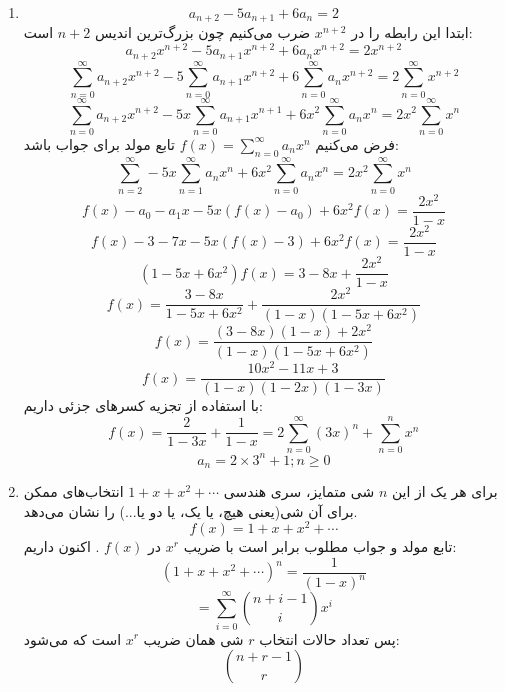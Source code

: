 \p
\begin{enumerate}
\item
$$a_{n+2} - 5a_{n+1} + 6a_n = 2$$
ابتدا این رابطه را در
$x^{n+2}$
ضرب می‌کنیم چون بزرگ‌ترین اندیس
$n+2$
است:
$$a_{n+2}x^{n+2} - 5a_{n+1}x^{n+2} + 6a_nx^{n+2} = 2x^{n+2}$$
$$\sum_{n=0}^{\infty}a_{n+2}x^{n+2} - 5\sum_{n=0}^{\infty}a_{n+1}x^{n+2} + 6\sum_{n=0}^{\infty}a_nx^{n+2} = 2\sum_{n=0}^{\infty}x^{n+2}$$
$$\sum_{n=0}^{\infty}a_{n+2}x^{n+2} - 5x\sum_{n=0}^{\infty}a_{n+1}x^{n+1} + 6x^2\sum_{n=0}^{\infty}a_nx^n = 2x^2\sum_{n=0}^{\infty}x^n$$
فرض می‌کنیم
$f(x) = \sum_{n=0}^{\infty}a_nx^n$
تابع مولد برای جواب باشد:
$$\sum_{n=2}^{\infty} - 5x\sum_{n=1}^{\infty}a_nx^n + 6x^2\sum_{n=0}^{\infty}a_nx^n = 2x^2\sum_{n=0}^{\infty}x^n$$
$$f(x) - a_0 - a_1x - 5x(f(x) - a_0) + 6x^2f(x) = \frac{2x^2}{1-x}$$
$$f(x) - 3 - 7x - 5x(f(x) - 3) + 6x^2f(x) = \frac{2x^2}{1-x}$$
$$(1 - 5x + 6x^2)f(x) = 3 - 8x + \frac{2x^2}{1-x}$$
$$f(x) = \frac{3-8x}{1-5x+6x^2} + \frac{2x^2}{(1-x)(1-5x+6x^2)}$$
$$f(x) = \frac{(3-8x)(1-x)+2x^2}{(1-x)(1-5x+6x^2)}$$
$$f(x) = \frac{10x^2-11x+3}{(1-x)(1-2x)(1-3x)}$$
با استفاده از تجزیه کسرهای جزئی داریم:
$$f(x) = \frac{2}{1-3x} + \frac{1}{1-x} = 2\sum_{n=0}^{\infty}(3x)^n + \sum_{n=0}^{n}x^n$$
$$a_n = 2 \times 3^n + 1; n \geq 0$$
\item
برای هر یک از این
$n$
شی متمایز، سری هندسی
$1 + x + x^2 + \cdots$
انتخاب‌های ممکن برای آن شی(یعنی هیچ، یا یک، یا دو یا...) را نشان می‌دهد.
$$f(x) = 1 + x + x^2 + \cdots$$
تابع مولد و جواب مطلوب برابر است با ضریب
$x^r$
در
$f(x)$
. اکنون داریم:
$$(1 + x + x^2 + \cdots)^n = \frac{1}{(1-x)^n}$$
$$= \sum_{i=0}^{\infty} \binom{n+i-1}{i} x^i$$
پس تعداد حالات انتخاب
$r$
شی همان ضریب
$x^r$
است که می‌شود:
$$\binom{n+r-1}{r}$$
\end{enumerate}